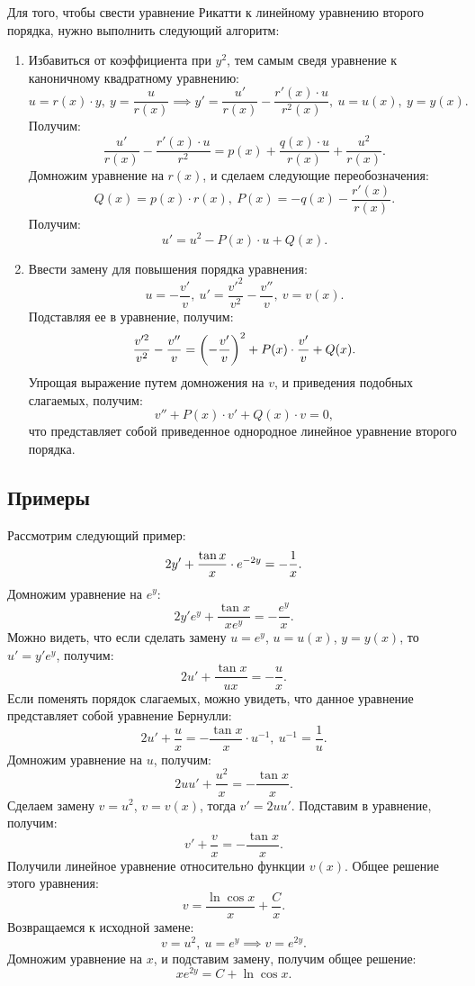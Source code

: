 	Для того, чтобы свести уравнение Рикатти к линейному уравнению второго порядка, нужно выполнить следующий алгоритм:
	\begin{enumerate}
		\item Избавиться от коэффициента при $y^2$, тем самым сведя уравнение к каноничному квадратному уравнению:
		\[ u = r(x) \cdot y, ~ y = \frac{u}{r(x)} \implies y' = \frac{u'}{r(x)} - \frac{r'(x) \cdot u}{r^2(x)}, ~ u = u(x), ~ y = y(x). \]
		Получим:
		\[ \frac{u'}{r(x)} - \frac{r'(x) \cdot u}{r^2} = p(x) + \frac{q(x) \cdot u}{r(x)} + \frac{u^2}{r(x)}. \]
		Домножим уравнение на $r(x)$, и сделаем следующие переобозначения:
		\[ Q(x) = p(x) \cdot r(x), ~ P(x) = - q(x) - \frac{r'(x)}{r(x)}. \]
		Получим:
		\[ u' = u^2 - P(x) \cdot u + Q(x). \]
		\item Ввести замену для повышения порядка уравнения:
		\[ u = -\frac{v'}{v}, ~ u' = \frac{v'^2}{v^2} - \frac{v''}{v}, ~ v = v(x). \]
		Подставляя ее в уравнение, получим:
		\[ \frac{v'^2}{v^2} - \frac{v''}{v} = \left( -\frac{v'}{v} \right)^2 + P(x) \cdot \frac{v'}{v} + Q(x). \]
		Упрощая выражение путем домножения на $v$, и приведения подобных слагаемых, получим:
		\[ v'' + P(x) \cdot v' + Q(x) \cdot v = 0, \]
		что представляет собой приведенное однородное линейное уравнение второго порядка.
	\end{enumerate}

	\subsection{Примеры}

		Рассмотрим следующий пример:
		\[ 2y' + \frac{\tan{x}}{x} \cdot e^{-2y} = - \dfrac{1}{x}. \]
		Домножим уравнение на $e^{y}$:
		\[ 2y' e^{y} + \frac{\tan{x}}{x e^{y}} = - \frac{e^{y}}{x}. \]
		Можно видеть, что если сделать замену $u = e^{y}$, $u = u(x)$, $y = y(x)$, то $u' = y' e^{y}$, получим:
		\[ 2u' + \frac{\tan{x}}{ux} = - \frac{u}{x}. \]
		Если поменять порядок слагаемых, можно увидеть, что данное уравнение представляет собой уравнение Бернулли:
		\[ 2u' + \frac{u}{x} = -\frac{\tan{x}}{x} \cdot u^{-1}, ~ u^{-1} = \frac{1}{u}. \]
		Домножим уравнение на $u$, получим:
		\[ 2uu' + \frac{u^2}{x} = - \frac{\tan{x}}{x}. \]
		Сделаем замену $v = u^2$, $v = v(x)$, тогда $v' = 2uu'$. Подставим в уравнение, получим:
		\[ v' + \frac{v}{x} = - \frac{\tan{x}}{x}. \]
		Получили линейное уравнение относительно функции $v(x)$. Общее решение этого уравнения:
		\[ v = \frac{\ln{\cos{x}}}{x} + \frac{C}{x}. \]
		Возвращаемся к исходной замене:
		\[ v = u^2, ~ u = e^{y} \implies v = e^{2y}. \]
		Домножим уравнение на $x$, и подставим замену, получим общее решение:
		\[ xe^{2y} = C + \ln{\cos{x}}. \]

